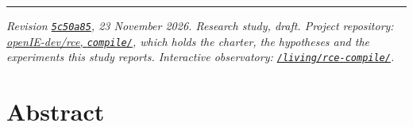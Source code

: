 \documentclass[10pt,letterpaper]{article}
\begin{document}
{
\small
\setcounter{tocdepth}{2}
\tableofcontents
}
\vspace{4pt}
\hrule
\vspace{8pt}

\emph{Revision
\href{https://github.com/openIE-dev/research-openie-web/commits/main/src/content/papers/rce-compile.md}{\texttt{5c50a85}},
23 November 2026. Research study, draft. Project repository:
\href{https://github.com/openIE-dev/rce/tree/main/compile}{openIE-dev/rce,
\texttt{compile/}}, which holds the charter, the hypotheses and the
experiments this study reports. Interactive observatory:
\href{https://research.openie.dev/living/rce-compile/}{\texttt{/\allowbreak{}living/\allowbreak{}rce-\allowbreak{}compile/\allowbreak{}}}.}

\section{Abstract}\label{abstract}
\end{document}
